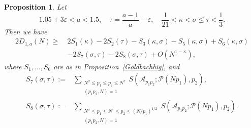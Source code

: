 \documentclass[10pt,a4paper]{amsart}
\newtheorem{proposition}{Proposition}
\def\ge{\geqslant}
\def\le{\leqslant}
\begin{document}
\begin{proposition}\label{Goldbachsmall}
Let 
$$
1.05+3\varepsilon<a<1.5,\quad \tau=\dfrac{a-1}{a}-\varepsilon, \quad 
\frac{1}{21}<\kappa<\sigma\le \tau< \frac{1}{3}. 
$$ 
Then we have
		\begin{equation}\label{Goldbachsmallw2}
		\begin{split}
		2D_{1,a}(N)\ge\ & 2S_1(\kappa)-2S_2(\tau)-S_3(\kappa,\sigma)-S_5(\kappa,\sigma)+S_6(\kappa,\sigma)\\
		&-2S_7(\sigma,\tau)-2S_8(\sigma,\tau)+O(N^{1-\kappa}),
		\end{split}
		\end{equation}
where $S_1, \ldots, S_6$ are as in Proposition~\ref{Goldbachbig}, and 
\begin{equation}
\begin{split}
S_{7}(\sigma,\tau):=&\sum_{\substack{N^\sigma \le p_1 \le p_2 \le N^\tau \\ (p_1 p_2, N) = 1}}  S(\mathscr{A}_{p_1 p_2}; \mathscr{P}(N p_1), p_2), \\
S_{8}(\sigma,\tau):=&\sum_{\substack{N^\sigma \le p_1 \le N^\tau\le p_2 \le (N/p_1)^{1/2} \\ (p_1 p_2, N) = 1}}  S(\mathscr{A}_{p_1 p_2}; \mathscr{P}(N p_1), p_2). 
\end{split}
\end{equation}
\end{proposition}
\end{document}
